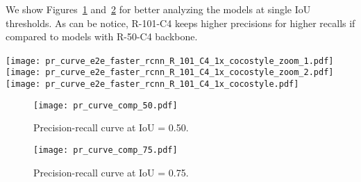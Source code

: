 We show Figures~\ref{fig:prec-rec_curve_50} and~\ref{fig:prec-rec_curve_75} for better analyzing the models at single IoU thresholds.
As can be notice, R-101-C4 keeps higher precisions for higher recalls if compared to models with R-50-C4 backbone.
%
\begin{figure*}[htb!]
	\centering
	\texttt{[image: pr\_curve\_e2e\_faster\_rcnn\_R\_101\_C4\_1x\_cocostyle\_zoom\_1.pdf]}~
	\texttt{[image: pr\_curve\_e2e\_faster\_rcnn\_R\_101\_C4\_1x\_cocostyle\_zoom\_2.pdf]}\\
	\vspace{2mm}
	\texttt{[image: pr\_curve\_e2e\_faster\_rcnn\_R\_101\_C4\_1x\_cocostyle.pdf]}
	\caption{Precision-recall curve for R-101-C4 at various IoUs.}
	\label{fig:pr_R101C4}
\end{figure*}
%
%
\begin{figure}[htb!]
	\centering
	\texttt{[image: pr\_curve\_comp\_50.pdf]}
	\caption{Precision-recall curve at IoU = 0.50.}
	\label{fig:prec-rec_curve_50}
\end{figure}
%
\begin{figure}[htb!]
	\centering
	\texttt{[image: pr\_curve\_comp\_75.pdf]}
	\caption{Precision-recall curve at IoU = 0.75.}
	\label{fig:prec-rec_curve_75}
\end{figure}


